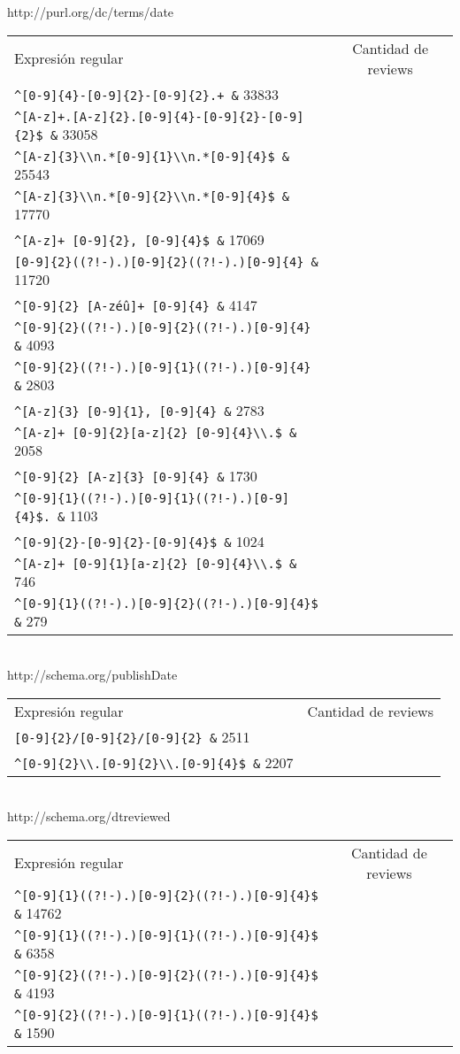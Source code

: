 http://purl.org/dc/terms/date
\begin{tabular}{| l | c |}
Expresión regular & Cantidad de reviews\\
\verb|^[0-9]{4}-[0-9]{2}-[0-9]{2}.+ &| 33833\\
\verb|^[A-z]+.[A-z]{2}.[0-9]{4}-[0-9]{2}-[0-9]{2}$ &| 33058\\
\verb|^[A-z]{3}\\n.*[0-9]{1}\\n.*[0-9]{4}$ &| 25543\\
\verb|^[A-z]{3}\\n.*[0-9]{2}\\n.*[0-9]{4}$ &| 17770\\
\verb|^[A-z]+ [0-9]{2}, [0-9]{4}$ &| 17069\\
\verb|[0-9]{2}((?!-).)[0-9]{2}((?!-).)[0-9]{4} &| 11720\\
\verb|^[0-9]{2} [A-zéû]+ [0-9]{4} &| 4147\\
\verb|^[0-9]{2}((?!-).)[0-9]{2}((?!-).)[0-9]{4} &| 4093\\
\verb|^[0-9]{2}((?!-).)[0-9]{1}((?!-).)[0-9]{4} &| 2803\\
\verb|^[A-z]{3} [0-9]{1}, [0-9]{4} &| 2783\\
\verb|^[A-z]+ [0-9]{2}[a-z]{2} [0-9]{4}\\.$ &| 2058\\
\verb|^[0-9]{2} [A-z]{3} [0-9]{4} &| 1730\\
\verb|^[0-9]{1}((?!-).)[0-9]{1}((?!-).)[0-9]{4}$. &| 1103\\
\verb|^[0-9]{2}-[0-9]{2}-[0-9]{4}$ &| 1024\\
\verb|^[A-z]+ [0-9]{1}[a-z]{2} [0-9]{4}\\.$ &| 746\\
\verb|^[0-9]{1}((?!-).)[0-9]{2}((?!-).)[0-9]{4}$ &| 279\\
\end{tabular}\\

http://schema.org/publishDate
\begin{tabular}{| l | c |}
Expresión regular & Cantidad de reviews\\
\verb|[0-9]{2}/[0-9]{2}/[0-9]{2} &| 2511\\
\verb|^[0-9]{2}\\.[0-9]{2}\\.[0-9]{4}$ &| 2207
\end{tabular}\\

http://schema.org/dtreviewed
\begin{tabular}{| l | c |}
Expresión regular & Cantidad de reviews\\
\verb|^[0-9]{1}((?!-).)[0-9]{2}((?!-).)[0-9]{4}$ &| 14762\\
\verb|^[0-9]{1}((?!-).)[0-9]{1}((?!-).)[0-9]{4}$ &| 6358\\
\verb|^[0-9]{2}((?!-).)[0-9]{2}((?!-).)[0-9]{4}$ &| 4193\\
\verb|^[0-9]{2}((?!-).)[0-9]{1}((?!-).)[0-9]{4}$ &| 1590
\end{tabular}

